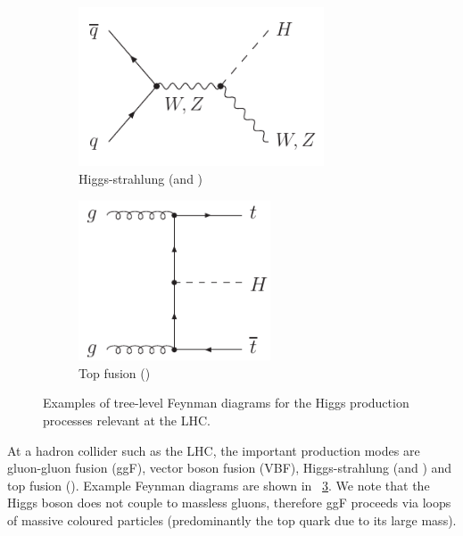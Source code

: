 \begin{figure}[t]
\begin{subfigure}[b]{0.4\textwidth}
	\end{subfigure}
	\hfill\null
	\\\bigskip
	\null\hfill
	\begin{subfigure}[b]{0.4\textwidth}
		\centering
		\includegraphics[width=0.8\textwidth]{axodraw/VH.pdf}
		\caption{Higgs-strahlung (\WH and \ZH)}
		\label{fig:feyn:VH}
	\end{subfigure}
	\hfill
	\begin{subfigure}[b]{0.4\textwidth}
		\centering
		\includegraphics[width=0.625\textwidth]{axodraw/ttH.pdf}
		\caption{Top fusion (\ttH)}
		\label{fig:feyn:ttH}
	\end{subfigure}
	\hfill\null
	\caption{Examples of tree-level Feynman diagrams for the Higgs production processes relevant at the LHC.}
	\label{fig:feyn}
\end{figure}

At a hadron collider such as the LHC, the important production modes are gluon-gluon 
fusion (ggF), vector boson fusion (VBF), Higgs-strahlung (\WH and \ZH) and top fusion 
(\ttH). Example Feynman diagrams are shown in \Figure~\ref{fig:feyn}. We note that the 
Higgs boson does not couple to massless gluons, therefore ggF proceeds via loops of 
massive coloured particles (predominantly the top quark due to its large mass). 

